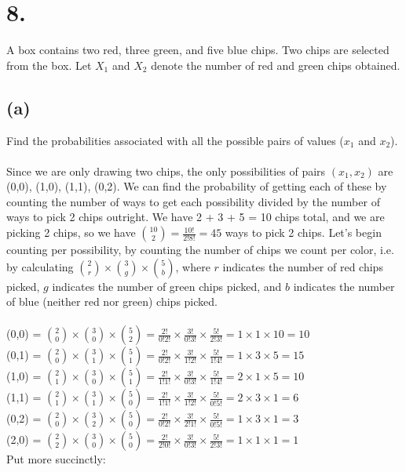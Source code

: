 \documentclass{article}
\begin{document}
{\section*{8.}
A box contains two red, three green, and five blue chips. Two chips are selected from the box.
Let \(X_1\) and \(X_2\) denote the number of red and green chips obtained.

\subsection*{(a)} 
Find the probabilities associated with all the possible pairs of values (\(x_1\) and \(x_2\)).
\\
\\
Since we are only drawing two chips, the only possibilities of pairs \((x_1, x_2)\) are (0,0), (1,0), (1,1), (0,2). We can find the probability of getting each of these by counting the number of ways to get each possibility divided by the number of ways to pick 2 chips outright. We have 2 + 3 + 5 = 10 chips total, and we are picking 2 chips, so we have \(\binom{10}{2} = \frac{10!}{2!8!} = 45\) ways to pick 2 chips. Let's begin counting per possibility, by counting the number of chips we count per color, i.e. by calculating \( \binom{2}{r} \times \binom{3}{g} \times \binom{5}{b} \), where \(r\) indicates the number of red chips picked, \(g\) indicates the number of green chips picked, and \(b\) indicates the number of blue (neither red nor green) chips picked. 
\\
\\
(0,0) = \( \binom{2}{0} \times \binom{3}{0} \times \binom{5}{2} = \frac{2!}{0!2!} \times \frac{3!}{0!3!} \times \frac{5!}{2!3!} = 1 \times 1 \times 10 = 10 \)
\\
(0,1) = \( \binom{2}{0} \times \binom{3}{1} \times \binom{5}{1} = \frac{2!}{0!2!} \times \frac{3!}{1!2!} \times \frac{5!}{1!4!} = 1 \times 3 \times 5 = 15 \)
\\
(1,0) = \( \binom{2}{1} \times \binom{3}{0} \times \binom{5}{1} = \frac{2!}{1!1!} \times \frac{3!}{0!3!} \times \frac{5!}{1!4!} = 2 \times 1 \times 5 = 10 \)
\\
(1,1) = \( \binom{2}{1} \times \binom{3}{1} \times \binom{5}{0} = \frac{2!}{1!1!} \times \frac{3!}{1!2!} \times \frac{5!}{0!5!} = 2 \times 3 \times 1 = 6 \)
\\
(0,2) = \( \binom{2}{0} \times \binom{3}{2} \times \binom{5}{0} = \frac{2!}{0!2!} \times \frac{3!}{2!1!} \times \frac{5!}{0!5!} = 1 \times 3 \times 1 = 3 \)
\\
(2,0) = \( \binom{2}{2} \times \binom{3}{0} \times \binom{5}{0} = \frac{2!}{2!0!} \times \frac{3!}{0!3!} \times \frac{5!}{2!3!} = 1 \times 1 \times 1 = 1 \)
\\
Put more succinctly:

}
\end{document}
